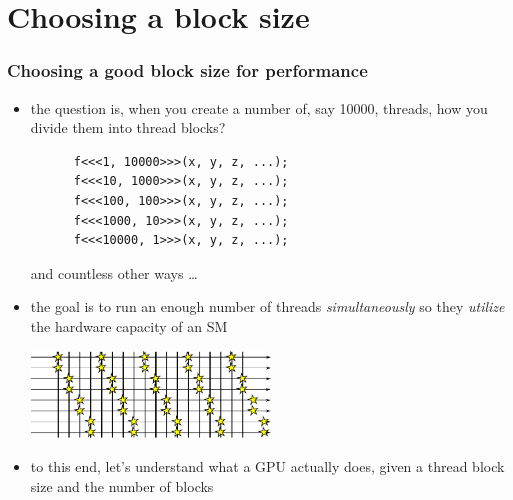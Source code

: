 \documentclass[12pt,dvipdfmx]{beamer}
\begin{document}
\section{Choosing a block size}
\begin{frame}[fragile]
  \frametitle{Choosing a good block size for performance}
  \begin{itemize}
  \item the question is, when you create a number of, say 10000, threads,
    how you divide them into thread blocks?
    \begin{lstlisting}
      f<<<1, 10000>>>(x, y, z, ...);
      f<<<10, 1000>>>(x, y, z, ...);
      f<<<100, 100>>>(x, y, z, ...);
      f<<<1000, 10>>>(x, y, z, ...);
      f<<<10000, 1>>>(x, y, z, ...);
\end{lstlisting}
    and countless other ways \ldots
  \item the goal is to run an enough number of threads {\it simultaneously}
    so they {\it utilize} the hardware capacity of an SM

\begin{center}
\includegraphics[width=0.5\textwidth]{out/pdf/svg/latency_4.pdf}
\end{center}
    
  \item to this end, let's understand what a GPU actually does,
    given a thread block size and the number of blocks
  \end{itemize}
\end{frame}
\end{document}
